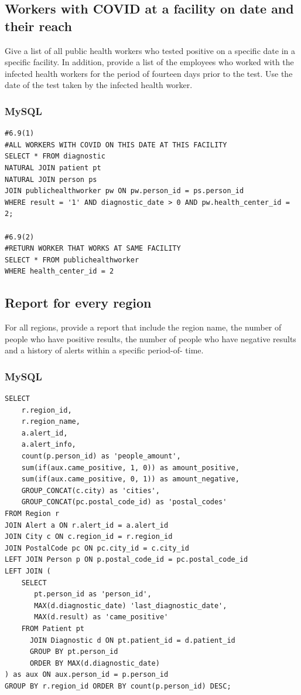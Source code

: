 \subsection{Workers with COVID at a facility on date and their reach}
Give a list of all public health workers who tested positive on a specific date
in a specific facility. In addition, provide a list of the employees who worked
with the infected health workers for the period of fourteen days prior to the
test. Use the date of the test taken by the infected health worker.

\subsubsection{MySQL}
\begin{verbatim}
#6.9(1)
#ALL WORKERS WITH COVID ON THIS DATE AT THIS FACILITY
SELECT * FROM diagnostic
NATURAL JOIN patient pt
NATURAL JOIN person ps
JOIN publichealthworker pw ON pw.person_id = ps.person_id
WHERE result = '1' AND diagnostic_date > 0 AND pw.health_center_id = 2;

#6.9(2)
#RETURN WORKER THAT WORKS AT SAME FACILITY 
SELECT * FROM publichealthworker
WHERE health_center_id = 2
\end{verbatim}

\subsection{Report for every region}
For all regions, provide a report that include the region name, the number
of people who have positive results, the number of people who have
negative results and a history of alerts within a specific period-of- time. 

\subsubsection{MySQL}
\begin{verbatim}
SELECT
    r.region_id,
    r.region_name,
    a.alert_id,
    a.alert_info,
    count(p.person_id) as 'people_amount',
    sum(if(aux.came_positive, 1, 0)) as amount_positive,
    sum(if(aux.came_positive, 0, 1)) as amount_negative,
    GROUP_CONCAT(c.city) as 'cities',
    GROUP_CONCAT(pc.postal_code_id) as 'postal_codes'
FROM Region r
JOIN Alert a ON r.alert_id = a.alert_id
JOIN City c ON c.region_id = r.region_id
JOIN PostalCode pc ON pc.city_id = c.city_id
LEFT JOIN Person p ON p.postal_code_id = pc.postal_code_id
LEFT JOIN (
    SELECT 
       pt.person_id as 'person_id',
       MAX(d.diagnostic_date) 'last_diagnostic_date',
       MAX(d.result) as 'came_positive'
    FROM Patient pt
      JOIN Diagnostic d ON pt.patient_id = d.patient_id
      GROUP BY pt.person_id
      ORDER BY MAX(d.diagnostic_date) 
) as aux ON aux.person_id = p.person_id
GROUP BY r.region_id ORDER BY count(p.person_id) DESC;
\end{verbatim}
